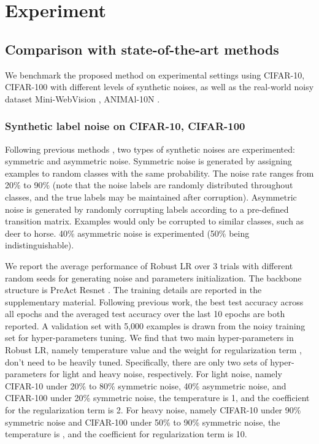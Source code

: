 \documentclass[letterpaper]{article} \usepackage{aaai23}  \usepackage{times}  \usepackage{helvet}  \usepackage{courier}  \usepackage[hyphens]{url}  \usepackage{graphicx} \urlstyle{rm} \def\UrlFont{\rm}  \usepackage{natbib}  \usepackage{caption} \frenchspacing  \setlength{\pdfpagewidth}{8.5in} \setlength{\pdfpageheight}{11in} \usepackage{algorithm}
\begin{document}
\section{Experiment}
\subsection{Comparison with state-of-the-art methods}
We benchmark the proposed method on experimental settings using CIFAR-10, CIFAR-100 \cite{krizhevsky2009learning} with different levels of synthetic noises, as well as the real-world noisy dataset Mini-WebVision \cite{li2017webvision},  ANIMAl-10N \cite{DBLP:conf/icml/SongK019}.
\subsubsection{Synthetic label noise on CIFAR-10, CIFAR-100}

Following previous methods \cite{kim2019nlnl,li2020dividemix}, two types of synthetic noises are experimented: symmetric and asymmetric noise.
Symmetric noise is generated by assigning examples to random classes with the same probability.
The noise rate ranges from 20\% to 90\% (note that the noise labels are randomly distributed throughout  classes, and the true labels may be maintained after corruption).
Asymmetric noise is generated by randomly corrupting labels according to a pre-defined transition matrix. 
Examples would only be corrupted to similar classes, such as deer to horse. 
40\% asymmetric noise is experimented (50\% being indistinguishable).

We report the average performance of Robust LR over 3 trials with different random seeds for generating noise and parameters initialization.
The backbone structure is PreAct Resnet \cite{he2016deep}. 
The training details are reported in the supplementary material.
Following previous work, the best test accuracy across all epochs and the averaged test accuracy over the last 10 epochs are both reported.
A validation set with 5,000 examples is drawn from the noisy training set for hyper-parameters tuning.
We find that two main hyper-parameters in Robust LR, namely temperature value and the weight for regularization term \cite{tanaka2018joint,arazo2019unsupervised}, don't need to be heavily tuned. 
Specifically, there are only two sets of hyper-parameters for light and heavy noise, respectively.
For light noise, namely CIFAR-10 under 20\% to 80\% symmetric noise, 40\% asymmetric noise, and CIFAR-100 under 20\% symmetric noise, the temperature is 1, and the coefficient for the regularization term is 2.
For heavy noise, namely CIFAR-10 under 90\% symmetric noise and CIFAR-100 under 50\% to 90\% symmetric noise, the temperature is , and the coefficient for regularization term is 10.
\end{document}
